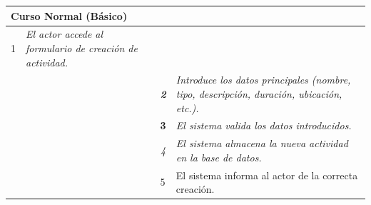     \begin{table}[H]
        \begin{tabular}{llllllll}
        \hline
        \multicolumn{8}{|l|}{\cellcolor[HTML]{F2F2F2}Curso Normal (Básico)}                                                                                                                                                                                                                                                                          \\ \hline
        \multicolumn{1}{|c|}{1}  & \multicolumn{1}{l|}{{\color[HTML]{808080} \textit{El actor accede al formulario de creación de actividad.}}} & \multicolumn{1}{l|}{{\color[HTML]{808080} }}                    & \multicolumn{5}{l|}{{\color[HTML]{808080} }}                                                                                            \\ \hline
        \multicolumn{1}{|c|}{}   & \multicolumn{1}{l|}{{\color[HTML]{808080} \textit{}}}                                                 & \multicolumn{1}{c|}{{\color[HTML]{808080} \textit{\textbf{2}}}} & \multicolumn{5}{p{6cm}|}{{\color[HTML]{808080} \textit{Introduce los datos principales (nombre, tipo, descripción, duración, ubicación, etc.).}}}                         \\ \hline
        \multicolumn{1}{|l|}{}   & \multicolumn{1}{l|}{{\color[HTML]{808080} }}                                                          & \multicolumn{1}{l|}{{\color[HTML]{808080} \textbf{3}}}          & \multicolumn{5}{p{6cm}|}{{\color[HTML]{808080} \textit{El sistema valida los datos introducidos.}}} \\ \hline
        \multicolumn{1}{|l|}{}   & \multicolumn{1}{l|}{{\color[HTML]{808080} }}                                                          & \multicolumn{1}{c|}{{\color[HTML]{808080} \textit{4}}}          & \multicolumn{5}{p{6cm}|}{{\color[HTML]{808080} \textit{El sistema almacena la nueva actividad en la base de datos.}}}                   \\ \hline
        \multicolumn{1}{|l|}{}   & \multicolumn{1}{l|}{{\color[HTML]{808080} }}                                                          & \multicolumn{1}{l|}{{\color[HTML]{808080} 5}}                   & \multicolumn{5}{p{6cm}|}{{\color[HTML]{808080} El sistema informa al actor de la correcta creación.}}                                  \\ \hline
        \end{tabular}
        \end{table}

